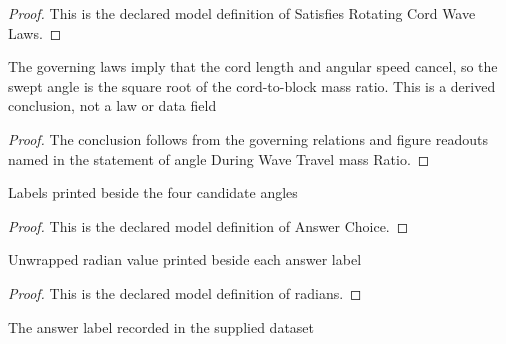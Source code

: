 \begin{proof}
  This is the declared model definition of Satisfies Rotating Cord Wave Laws.
\end{proof}
\begin{lemma}
  \label{lem:physics:phyx-mini-0243:phyxminiproblems-problemphyxmini0243-angleduringwavetravel-massratio}
  The governing laws imply that the cord length and angular speed cancel, so the swept angle is the square root of the cord-to-block mass ratio. This is a derived conclusion, not a law or data field
\end{lemma}
\begin{proof}
  The conclusion follows from the governing relations and figure readouts named in the statement of angle During Wave Travel mass Ratio.
\end{proof}
\begin{definition}
  \label{def:physics:phyx-mini-0243:phyxminiproblems-problemphyxmini0243-answerchoice}
  Labels printed beside the four candidate angles
\end{definition}
\begin{proof}
  This is the declared model definition of Answer Choice.
\end{proof}
\begin{definition}[radians]
  \label{def:physics:phyx-mini-0243:phyxminiproblems-problemphyxmini0243-answerchoice-radians}
  Unwrapped radian value printed beside each answer label
\end{definition}
\begin{proof}
  This is the declared model definition of radians.
\end{proof}
\begin{definition}
  \label{def:physics:phyx-mini-0243:phyxminiproblems-problemphyxmini0243-recordedanswerchoice}
  The answer label recorded in the supplied dataset
\end{definition}
